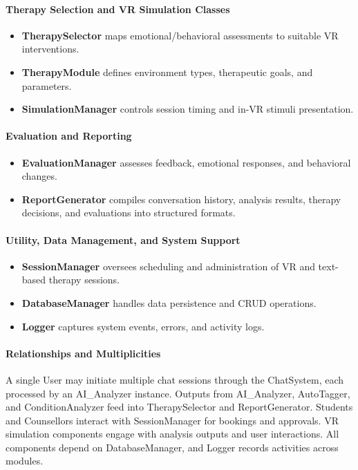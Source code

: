 \paragraph{Therapy Selection and VR Simulation Classes}
\begin{itemize}
    \item \textbf{TherapySelector} maps emotional/behavioral assessments to suitable VR interventions.
    \item \textbf{TherapyModule} defines environment types, therapeutic goals, and parameters.
    \item \textbf{SimulationManager} controls session timing and in-VR stimuli presentation.
\end{itemize}

\paragraph{Evaluation and Reporting}
\begin{itemize}
    \item \textbf{EvaluationManager} assesses feedback, emotional responses, and behavioral changes.
    \item \textbf{ReportGenerator} compiles conversation history, analysis results, therapy decisions, and evaluations into structured formats.
\end{itemize}

\paragraph{Utility, Data Management, and System Support}
\begin{itemize}
    \item \textbf{SessionManager} oversees scheduling and administration of VR and text-based therapy sessions.
    \item \textbf{DatabaseManager} handles data persistence and CRUD operations.
    \item \textbf{Logger} captures system events, errors, and activity logs.
\end{itemize}

\paragraph{Relationships and Multiplicities}
A single User may initiate multiple chat sessions through the ChatSystem, each processed by an AI\_Analyzer instance. Outputs from AI\_Analyzer, AutoTagger, and ConditionAnalyzer feed into TherapySelector and ReportGenerator. Students and Counsellors interact with SessionManager for bookings and approvals. VR simulation components engage with analysis outputs and user interactions. All components depend on DatabaseManager, and Logger records activities across modules.

